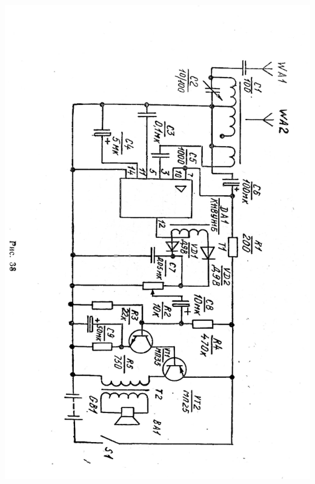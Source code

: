 \documentclass[12pt]{article}
\begin{document}
\vspace*{1cm}
\hspace*{0.7cm}\includegraphics[scale=0.35, angle=180]{Fig38}

\newpage

\hrulefill
\end{document}
